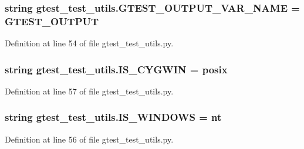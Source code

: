 \subsubsection[{\texorpdfstring{G\+T\+E\+S\+T\+\_\+\+O\+U\+T\+P\+U\+T\+\_\+\+V\+A\+R\+\_\+\+N\+A\+ME}{GTEST_OUTPUT_VAR_NAME}}]{\setlength{\rightskip}{0pt plus 5cm}string gtest\+\_\+test\+\_\+utils.\+G\+T\+E\+S\+T\+\_\+\+O\+U\+T\+P\+U\+T\+\_\+\+V\+A\+R\+\_\+\+N\+A\+ME = \textquotesingle{}G\+T\+E\+S\+T\+\_\+\+O\+U\+T\+P\+UT\textquotesingle{}}\hypertarget{namespacegtest__test__utils_aeb3755b4dd33aabe1baee781fecc1e66}{}\label{namespacegtest__test__utils_aeb3755b4dd33aabe1baee781fecc1e66}


Definition at line 54 of file gtest\+\_\+test\+\_\+utils.\+py.

\subsubsection[{\texorpdfstring{I\+S\+\_\+\+C\+Y\+G\+W\+IN}{IS_CYGWIN}}]{\setlength{\rightskip}{0pt plus 5cm}string gtest\+\_\+test\+\_\+utils.\+I\+S\+\_\+\+C\+Y\+G\+W\+IN = \textquotesingle{}posix\textquotesingle{}}\hypertarget{namespacegtest__test__utils_a6a936096debb3c2e807d000f76245740}{}\label{namespacegtest__test__utils_a6a936096debb3c2e807d000f76245740}


Definition at line 57 of file gtest\+\_\+test\+\_\+utils.\+py.

\subsubsection[{\texorpdfstring{I\+S\+\_\+\+W\+I\+N\+D\+O\+WS}{IS_WINDOWS}}]{\setlength{\rightskip}{0pt plus 5cm}string gtest\+\_\+test\+\_\+utils.\+I\+S\+\_\+\+W\+I\+N\+D\+O\+WS = \textquotesingle{}nt\textquotesingle{}}\hypertarget{namespacegtest__test__utils_a7555b17006f1c078cda336750b8613e0}{}\label{namespacegtest__test__utils_a7555b17006f1c078cda336750b8613e0}


Definition at line 56 of file gtest\+\_\+test\+\_\+utils.\+py.

